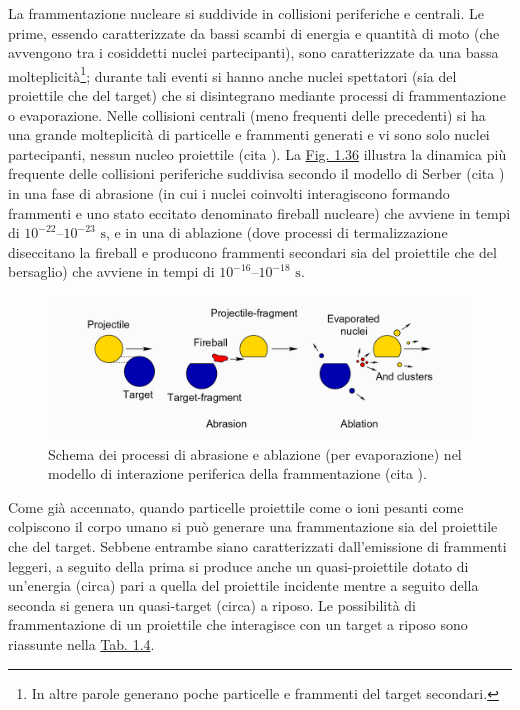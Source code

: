 \documentclass[12pt,a4paper,twoside]{report}
\begin{document}
	La frammentazione nucleare si suddivide in collisioni periferiche e centrali. Le prime, essendo caratterizzate da bassi scambi di energia e quantità di moto (che avvengono tra i cosiddetti nuclei partecipanti), sono caratterizzate da una bassa molteplicità\footnote{In altre parole generano poche particelle e frammenti del target secondari.}; durante tali eventi si hanno anche nuclei spettatori (sia del proiettile che del target) che si disintegrano mediante processi di frammentazione o evaporazione. Nelle collisioni centrali (meno frequenti delle precedenti) si ha una grande molteplicità di particelle e frammenti generati e vi sono solo nuclei partecipanti, nessun nucleo proiettile (cita
	). La \hyperref[fig:fragmentation]{Fig. 1.36} illustra la dinamica più frequente delle collisioni periferiche suddivisa secondo il modello di Serber (cita
	) in una fase di abrasione (in cui i nuclei coinvolti interagiscono formando frammenti e uno stato eccitato denominato fireball nucleare) che avviene in tempi di $10^{-22}$--$10^{-23}\mbox{ s}$, e in una di ablazione (dove processi di termalizzazione diseccitano la fireball e producono frammenti secondari sia del proiettile che del bersaglio) che avviene in tempi di $10^{-16}$--$10^{-18}\mbox{ s}$.
	
	\begin{figure}[H]
		\centering
		\includegraphics[width=0.9\linewidth]{fragmentation.png}
		\caption{Schema dei processi di abrasione e ablazione (per evaporazione) nel modello di interazione periferica della frammentazione (cita
			).}
		\label{fig:fragmentation}
	\end{figure}
	
	Come già accennato, quando particelle proiettile come  o ioni pesanti come  colpiscono il corpo umano si può generare una frammentazione sia del proiettile che del target. Sebbene entrambe siano caratterizzati dall'emissione di frammenti leggeri, a seguito della prima si produce anche un quasi-proiettile dotato di un'energia (circa) pari a quella del proiettile incidente mentre a seguito della seconda si genera un quasi-target (circa) a riposo. Le possibilità di frammentazione di un proiettile che interagisce con un target a riposo sono riassunte nella \hyperref[tab:fragmentation]{Tab. 1.4}.
	
\end{document}
